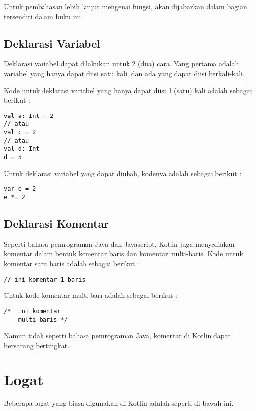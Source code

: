 Untuk pembahasan lebih lanjut mengenai fungsi, akan dijabarkan dalam bagian tersendiri dalam buku ini.

\subsection{Deklarasi Variabel}

Deklarasi variabel dapat dilakukan untuk 2 (dua) cara. Yang pertama adalah variabel yang hanya dapat diisi satu kali, dan ada yang dapat diisi berkali-kali. 

Kode untuk deklarasi variabel yang hanya dapat diisi 1 (satu) kali adalah sebagai berikut :

\begin{lstlisting}
val a: Int = 2 
// atau 
val c = 2
// atau
val d: Int
d = 5
\end{lstlisting}

Untuk deklarasi variabel yang dapat diubah, kodenya adalah sebagai berikut :

\begin{lstlisting}
var e = 2
e *= 2
\end{lstlisting}

\subsection{Deklarasi Komentar}

Seperti bahasa pemrograman Java dan Javascript, Kotlin juga menyediakan komentar dalam bentuk komentar baris dan komentar multi-baris. Kode untuk komentar satu baris adalah sebagai berikut :

\begin{lstlisting}
// ini komentar 1 baris
\end{lstlisting}

Untuk kode komentar multi-bari adalah sebagai berikut :

\begin{lstlisting}
/*  ini komentar
    multi baris */
\end{lstlisting}

Namun tidak seperti bahasa pemrograman Java, komentar di Kotlin dapat bersarang bertingkat.

\section{Logat}

Beberapa logat yang biasa digunakan di Kotlin adalah seperti di bawah ini.

